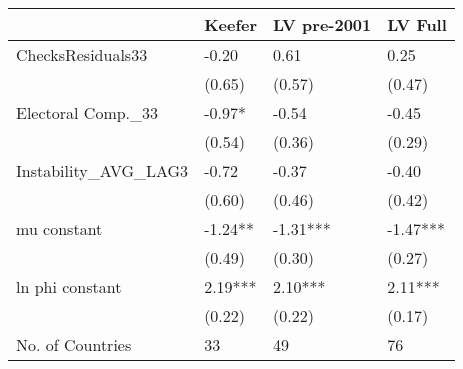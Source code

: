 \begin{tabular}{llll}
  \hline
 & Keefer & LV pre-2001 & LV Full \\ 
  \hline
ChecksResiduals33 & -0.20 & 0.61 & 0.25 \\ 
   & (0.65) & (0.57) & (0.47) \\ 
  Electoral Comp.\_33 & -0.97* & -0.54 & -0.45 \\ 
   & (0.54) & (0.36) & (0.29) \\ 
  Instability\_AVG\_LAG3 & -0.72 & -0.37 & -0.40 \\ 
   & (0.60) & (0.46) & (0.42) \\ 
  mu constant & -1.24** & -1.31*** & -1.47*** \\ 
   & (0.49) & (0.30) & (0.27) \\ 
  ln phi constant & 2.19*** & 2.10*** & 2.11*** \\ 
   & (0.22) & (0.22) & (0.17) \\ 
  No. of Countries & 33 & 49 & 76 \\ 
   \hline
\end{tabular}
